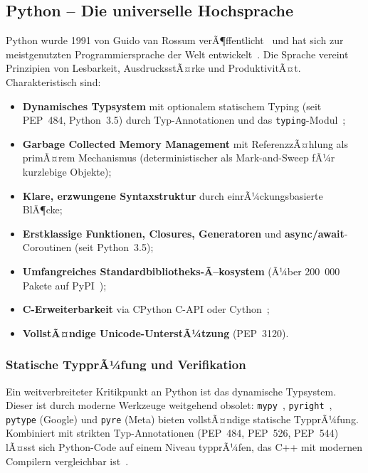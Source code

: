 ﻿\documentclass[12pt,a4paper,twoside]{article}
\begin{document}
\subsection{Python -- Die universelle Hochsprache}
\label{subsec:python}

Python wurde 1991 von Guido van Rossum verÃ¶ffentlicht~\cite{vanrossum1995python}
und hat sich zur meistgenutzten Programmiersprache der Welt entwickelt~\cite{tiobe2025}.
Die Sprache vereint Prinzipien von Lesbarkeit, AusdrucksstÃ¤rke und
ProduktivitÃ¤t. Charakteristisch sind:

\begin{itemize}
  \item \textbf{Dynamisches Typsystem} mit optionalem statischem Typing (seit PEP~484,
        Python~3.5) durch Typ-Annotationen und das \texttt{typing}-Modul~\cite{pep484};
  \item \textbf{Garbage Collected Memory Management} mit ReferenzzÃ¤hlung als primÃ¤rem
        Mechanismus (deterministischer als Mark-and-Sweep fÃ¼r kurzlebige Objekte);
  \item \textbf{Klare, erzwungene Syntaxstruktur} durch einrÃ¼ckungsbasierte BlÃ¶cke;
  \item \textbf{Erstklassige Funktionen, Closures, Generatoren} und
        \textbf{async/await}-Coroutinen (seit Python~3.5);
  \item \textbf{Umfangreiches Standardbibliotheks-Ã–kosystem} (Ã¼ber 200~000 Pakete
        auf PyPI~\cite{pypi_stats2024});
  \item \textbf{C-Erweiterbarkeit} via CPython C-API oder Cython~\cite{cython_book};
  \item \textbf{VollstÃ¤ndige Unicode-UnterstÃ¼tzung} (PEP~3120).
\end{itemize}

\subsubsection{Statische TypprÃ¼fung und Verifikation}
Ein weitverbreiteter Kritikpunkt an Python ist das dynamische Typsystem.
Dieser ist durch moderne Werkzeuge weitgehend obsolet: \texttt{mypy}~\cite{mypy_lehtosalo2016},
\texttt{pyright}~\cite{pyright_microsoft}, \texttt{pytype} (Google)
und \texttt{pyre} (Meta) bieten vollstÃ¤ndige statische TypprÃ¼fung.
Kombiniert mit strikten Typ-Annotationen (PEP~484, PEP~526, PEP~544)
lÃ¤sst sich Python-Code auf einem Niveau typprÃ¼fen, das C++
mit modernen Compilern vergleichbar ist~\cite{gros2021python_types}.
\end{document}
